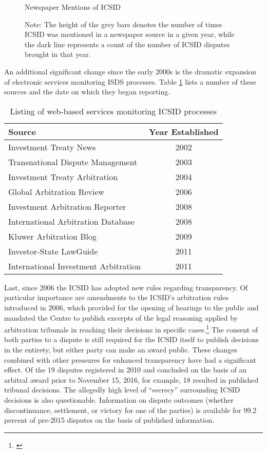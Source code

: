 \documentclass[12pt,onesided]{amsart}
\begin{document}
\begin{figure}[ht]
	\centering
	\caption{Newspaper Mentions of ICSID}
	\label{fig:icsidMedia}
	\resizebox{.8\textwidth}{!}{}
	\caption*{Note: The height of the grey bars denotes the number of times ICSID was mentioned in a newspaper source in a given year, while the dark line represents a count of the number of ICSID disputes brought in that year.}
\end{figure}
\FloatBarrier

An additional significant change since the early 2000s is the dramatic expansion of electronic services monitoring ISDS processes. Table \ref{tab:disputeSites} lists a number of these sources and the date on which they began reporting. 

\begin{table}[ht]
\centering
\caption{Listing of web-based services monitoring ICSID processes}
\label{tab:disputeSites}
\begin{tabular}{lc}
	\hline\hline
	Source & Year Established \\
	\hline
	Investment Treaty News & 2002 \\
	Transnational Dispute Management & 2003 \\
	Investment Treaty Arbitration & 2004 \\
	Global Arbitration Review & 2006 \\
	Investment Arbitration Reporter & 2008 \\
	International Arbitration Database & 2008 \\
	Kluwer Arbitration Blog & 2009 \\
	Investor-State LawGuide & 2011 \\
	International Investment Arbitration & 2011 \\
	\hline\hline
\end{tabular}
\end{table}
\FloatBarrier

Last, since 2006 the ICSID has adopted new rules regarding transparency. Of particular importance are amendments to the ICSID's arbitration rules introduced in 2006, which provided for the opening of hearings to the public and mandated the Centre to publish excerpts of the legal reasoning applied by arbitration tribunals in reaching their decisions in specific cases.\footnote{\citet{yackee20112006,antonietti:2006}} The consent of both parties to a dispute is still required for the ICSID itself to publish decisions in the entirety, but either party can make an award public. These changes combined with other pressures for enhanced transparency have had a significant effect. Of the 19 disputes registered in 2010 and concluded on the basis of an arbitral award prior to November 15, 2016, for example, 18 resulted in published tribunal decisions. The allegedly high level of ``secrecy'' surrounding ICSID decisions is also questionable. Information on dispute outcomes (whether discontinuance, settlement, or victory for one of the parties) is available for 99.2 percent of pre-2015 disputes on the basis of published information.
\end{document}
